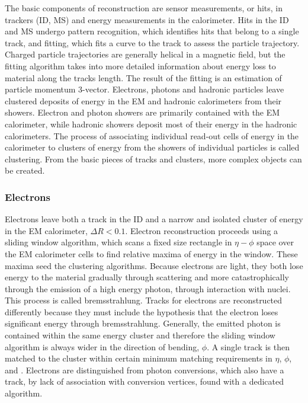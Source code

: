 The basic components of reconstruction are sensor measurements, or hits, in trackers (ID, MS) and energy measurements in the calorimeter. Hits in the ID and MS undergo pattern recognition, which identifies hits that belong to a single track, and fitting, which fits a curve to the track to assess the particle trajectory. Charged particle trajectories are generally helical in a magnetic field, but the fitting algorithm takes into more detailed information about energy loss to material along the tracks length. The result of the fitting is an estimation of particle momentum 3-vector. Electrons, photons and hadronic particles leave clustered deposits of energy in the EM and hadronic calorimeters from their showers. Electron and photon showers are primarily contained with the EM calorimeter, while hadronic showers deposit most of their energy in the hadronic calorimeters. The process of associating individual read-out cells of energy in the calorimeter to clusters of energy from the showers of individual particles is called clustering. From the basic pieces of tracks and clusters, more complex objects can be created. 

\subsubsection{Electrons}

Electrons leave both a track in the ID and a narrow and isolated cluster of energy in the EM calorimeter, $\Delta R < 0.1$. Electron reconstruction proceeds using a sliding window algorithm, which scans a fixed size rectangle in $\eta-\phi$ space over the EM calorimeter cells to find relative maxima of energy in the window\cite{ATLAS-CONF-2014-032}. These maxima seed the clustering algorithms. Because electrons are light, they both lose energy to the material gradually through scattering and more catastrophically through the emission of a high energy photon, through interaction with nuclei. This process is called bremsstrahlung. Tracks for electrons are reconstructed differently because they must include the hypothesis that the electron loses significant energy through bremsstrahlung. Generally, the emitted photon is contained within the same energy cluster and therefore the sliding window algorithm is always wider in the direction of bending, $\phi$. A single track is then matched to the cluster within certain minimum matching requirements in $\eta$, $\phi$, and \pt. Electrons are distinguished from photon conversions, which also have a track, by lack of association with conversion vertices, found with a dedicated algorithm.

